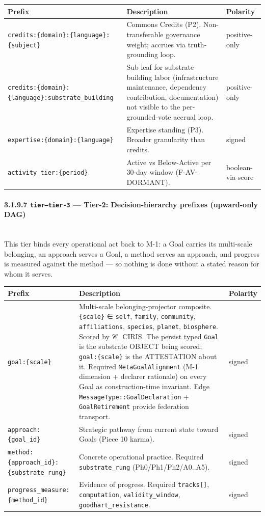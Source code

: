 \documentclass[11pt]{article}
\begin{document}
{\footnotesize
\begin{longtable}{|p{5.33cm}|p{5.33cm}|p{5.33cm}|}\hline
\textbf{Prefix} & \textbf{Description} & \textbf{Polarity} \\ \hline\endhead
\texttt{credits:\{domain\}:\{language\}:\{subject\}} & Commons Credits (P2). Non-transferable governance weight; accrues via truth-grounding loop. & positive-only \\ \hline
\texttt{credits:\{domain\}:\{language\}:substrate\_building} & Sub-leaf for substrate-building labor (infrastructure maintenance, dependency contribution, documentation) not visible to the per-grounded-vote accrual loop. & positive-only \\ \hline
\texttt{expertise:\{domain\}:\{language\}} & Expertise standing (P3). Broader granularity than credits. & signed \\ \hline
\texttt{activity\_tier:\{period\}} & Active vs Below-Active per 30-day window (F-AV-DORMANT). & boolean-via-score \\ \hline
\end{longtable}}


\paragraph{3.1.9.7 \texttt{tier--tier-3} — Tier-2: Decision-hierarchy prefixes (upward-only DAG)}\mbox{}\\


This tier binds every operational act back to M-1: a Goal carries its multi-scale belonging, an approach serves a Goal, a method serves an approach, and progress is measured against the method — so nothing is done without a stated reason for whom it serves.


{\footnotesize
\begin{longtable}{|p{5.33cm}|p{5.33cm}|p{5.33cm}|}\hline
\textbf{Prefix} & \textbf{Description} & \textbf{Polarity} \\ \hline\endhead
\texttt{goal:\{scale\}} & Multi-scale belonging-projector composite. \texttt{\{scale\}} ∈ \texttt{self}, \texttt{family}, \texttt{community}, \texttt{affiliations}, \texttt{species}, \texttt{planet}, \texttt{biosphere}. Scored by 𝒞\_CIRIS. The persist typed \texttt{Goal} is the substrate OBJECT being scored; \texttt{goal:\{scale\}} is the ATTESTATION about it. Required \texttt{MetaGoalAlignment} (M-1 dimension + declarer rationale) on every Goal as construction-time invariant. Edge \texttt{MessageType::GoalDeclaration} + \texttt{GoalRetirement} provide federation transport. & signed \\ \hline
\texttt{approach:\{goal\_id\}} & Strategic pathway from current state toward Goals (Piece 10 karma). & signed \\ \hline
\texttt{method:\{approach\_id\}:\{substrate\_rung\}} & Concrete operational practice. Required \texttt{substrate\_rung} (Ph0/Ph1/Ph2/A0..A5). & signed \\ \hline
\texttt{progress\_measure:\{method\_id\}} & Evidence of progress. Required \texttt{tracks[]}, \texttt{computation}, \texttt{validity\_window}, \texttt{goodhart\_resistance}. & signed \\ \hline
\end{longtable}}
\end{document}
